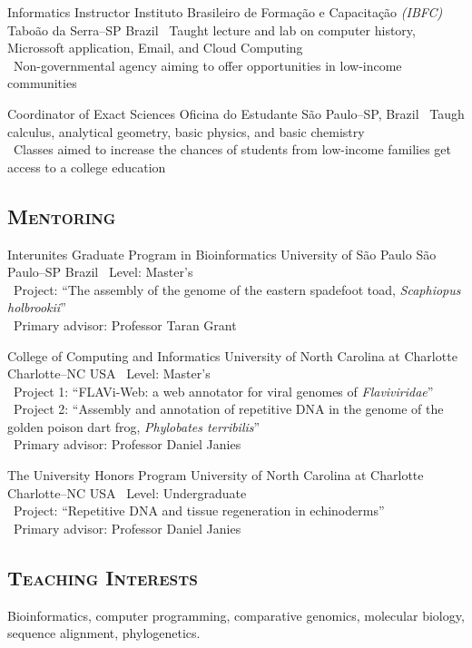 	{Informatics Instructor}
	{Instituto Brasileiro de Formação e Capacitação \emph{(IBFC)}}
	{Taboão da Serra--SP}
	{Brazil}
	{
		\textbullet~Taught lecture and lab  on computer history, Microssoft application, Email, and Cloud Computing\\
		\textbullet~Non-governmental agency aiming to offer opportunities in low-income communities
	}

\vspace{.5em}

	{Coordinator of Exact Sciences}
	{Oficina do Estudante}
	{São Paulo--SP, Brazil}
	{}
	{
		\textbullet~Taugh calculus, analytical geometry, basic physics, and basic chemistry\\
		\textbullet~Classes aimed to increase the chances of students from low-income families get access to a college education
	}

\vspace{.5em}
\subsection{\textsc{Mentoring}}
\vspace{.5em}

{Interunites Graduate Program in Bioinformatics}
{University of São Paulo}
{São Paulo--SP}
{Brazil}
{
	\textbullet~Level: Master's\\
	\textbullet~Project: ``The assembly of the genome of the eastern spadefoot toad, \emph{Scaphiopus holbrookii}''\\
	\textbullet~Primary advisor: Professor Taran Grant\\
}

\cventry{---}
{College of Computing and Informatics}
{University of North Carolina at Charlotte}
{Charlotte--NC}
{USA}
{
	\textbullet~Level: Master's\\
	\textbullet~Project 1: ``FLAVi-Web: a web annotator for viral genomes of \emph{Flaviviridae}''\\
	\textbullet~Project 2: ``Assembly and annotation of repetitive DNA in the genome of the golden poison dart frog, \emph{Phylobates terribilis}''\\
	\textbullet~Primary advisor: Professor Daniel Janies\\
}

\cventry{---}
{The University Honors Program}
{University of North Carolina at Charlotte}
{Charlotte--NC}
{USA}
{
	\textbullet~Level: Undergraduate\\
	\textbullet~Project: ``Repetitive DNA and tissue regeneration in echinoderms''\\
	\textbullet~Primary advisor: Professor Daniel Janies\\
}

\vspace{.5em}
	\subsection{\textsc{Teaching Interests}}
\vspace{.5em}

Bioinformatics, computer programming, comparative genomics, molecular biology, sequence alignment, phylogenetics.
